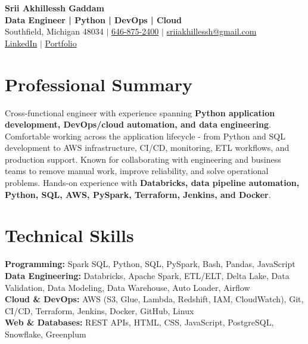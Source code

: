 \documentclass[letterpaper,10pt]{article}
\begin{document}
\fontsize{9.35pt}{10.45pt}\selectfont

\begin{center}
    {\LARGE \textbf{Srii Akhillessh Gaddam}} \\[-1pt]
    \textbf{Data Engineer | Python | DevOps | Cloud} \\[2pt]
    Southfield, Michigan 48034 $|$
    \href{tel:6468752400}{646-875-2400} $|$
    \href{mailto:sriiakhillessh@gmail.com}{sriiakhillessh@gmail.com} \\[1pt]
    \href{https://www.linkedin.com/in/srii-akhiilessh-gaddam-b48668191/}{LinkedIn} $|$
    \href{https://sriiakhillesshg.github.io/portfolio/}{Portfolio}
\end{center}
\vspace{-8pt}

\section{Professional Summary}
\small{Cross-functional engineer with experience spanning \textbf{Python application development, DevOps/cloud automation, and data engineering}. Comfortable working across the application lifecycle - from Python and SQL development to AWS infrastructure, CI/CD, monitoring, ETL workflows, and production support. Known for collaborating with engineering and business teams to remove manual work, improve reliability, and solve operational problems. Hands-on experience with \textbf{Databricks, data pipeline automation, Python, SQL, AWS, PySpark, Terraform, Jenkins, and Docker}.}

\section{Technical Skills}
\small{
\textbf{Programming:} Spark SQL, Python, SQL, PySpark, Bash, Pandas, JavaScript \\
\textbf{Data Engineering:} Databricks, Apache Spark, ETL/ELT, Delta Lake, Data Validation, Data Modeling, Data Warehouse, Auto Loader, Airflow \\
\textbf{Cloud \& DevOps:} AWS (S3, Glue, Lambda, Redshift, IAM, CloudWatch), Git, CI/CD, Terraform, Jenkins, Docker, GitHub, Linux \\
\textbf{Web \& Databases:} REST APIs, HTML, CSS, JavaScript, PostgreSQL, Snowflake, Greenplum
}
\end{document}
